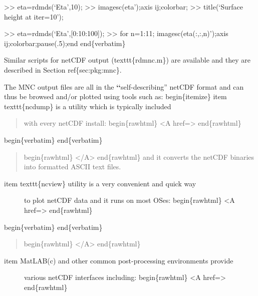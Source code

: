 \documentclass[letterpaper,10pt,english]{sphinxmanual}
\begin{document}
\textgreater{}\textgreater{} eta=rdmds(`Eta',10);
\textgreater{}\textgreater{} imagesc(eta');axis ij;colorbar;
\textgreater{}\textgreater{} title(`Surface height at iter=10');

\textgreater{}\textgreater{} eta=rdmds(`Eta',{[}0:10:100{]});
\textgreater{}\textgreater{} for n=1:11; imagesc(eta(:,:,n)');axis ij;colorbar;pause(.5);end
end\{verbatim\}

Similar scripts for netCDF output (texttt\{rdmnc.m\}) are available and
they are described in Section ref\{sec:pkg:mnc\}.

The MNC output files are all in the {\color{red}\bfseries{}{}`{}`}self-describing'' netCDF
format and can thus be browsed and/or plotted using tools such as:
begin\{itemize\}
item texttt\{ncdump\} is a utility which is typically included
\begin{quote}

with every netCDF install:
begin\{rawhtml\} \textless{}A href=\sphinxquotedblright{}\sphinxquotedblleft{}\textgreater{} end\{rawhtml\}
\end{quote}

begin\{verbatim\}
end\{verbatim\}
\begin{quote}

begin\{rawhtml\} \textless{}/A\textgreater{} end\{rawhtml\} and it converts the netCDF
binaries into formatted ASCII text files.
\end{quote}
\begin{description}
\item[{item texttt\{ncview\} utility is a very convenient and quick way}] \leavevmode
to plot netCDF data and it runs on most OSes:
begin\{rawhtml\} \textless{}A href=\sphinxquotedblright{}\sphinxquotedblleft{}\textgreater{} end\{rawhtml\}

\end{description}

begin\{verbatim\}
end\{verbatim\}
\begin{quote}

begin\{rawhtml\} \textless{}/A\textgreater{} end\{rawhtml\}
\end{quote}
\begin{description}
\item[{item MatLAB(c) and other common post-processing environments provide}] \leavevmode
various netCDF interfaces including:
begin\{rawhtml\} \textless{}A href=\sphinxquotedblright{}\sphinxquotedblleft{}\textgreater{} end\{rawhtml\}

\end{description}
\end{document}

